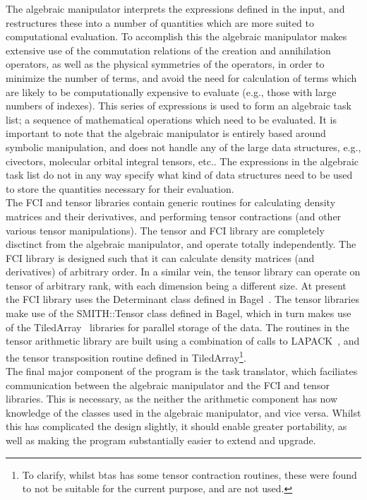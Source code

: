 \noindent The algebraic manipulator interprets the expressions defined
in the input, and restructures these into a number of quantities which are
more suited to computational evaluation. To accomplish this the
algebraic manipulator makes extensive use of the commutation
relations of the creation and annihilation operators, as well as the physical
symmetries of the operators, in order to minimize the number of terms, and
avoid the need for calculation of terms which are likely to be computationally
expensive to evaluate (e.g., those with large numbers of indexes). This series
of expressions is used to form an algebraic task list; a sequence of
mathematical operations which need to be evaluated.  It is important to note
that the algebraic manipulator is entirely based around symbolic manipulation,
and does not handle any of the large data structures, e.g., civectors,
molecular orbital integral tensors, etc.. The expressions in the algebraic
task list do not in any way specify what kind of data structures need to
be used to store the quantities necessary for their evaluation.\\

\noindent The FCI and tensor libraries contain generic routines for
calculating density matrices and their derivatives, and performing tensor
contractions (and other various tensor manipulations). The tensor and FCI
library are completely disctinct from the algebraic manipulator, and operate
totally independently. The FCI library is designed such that it can calculate
density matrices (and derivatives) of arbitrary order. In a similar vein, the
tensor library can operate on tensor of arbitrary rank, with each dimension
being a different size. At present the FCI  library uses the Determinant class
defined in Bagel~\cite{BAGEL}.
The tensor libraries make use of the SMITH::Tensor class defined in Bagel,
which in turn makes use of the TiledArray~\cite{TiledArray} libraries for parallel storage of the data. 
The routines in the tensor arithmetic library are built using 
a combination of calls to LAPACK~\cite{LAPACK}, and the tensor transposition routine defined in
TiledArray\footnote{ To clarify, whilst btas has some tensor contraction routines, 
these were found to not be suitable for the current purpose, and are not used.}.\\

\noindent The final major component of the program is the task translator,
which faciliates communication between the algebraic manipulator and the 
FCI and tensor libraries. This is necessary, as
the neither the arithmetic component has now knowledge of the classes used in
the algebraic manipulator, and vice versa. Whilst this has complicated the
design slightly, it should enable greater portability, as well as making the
program substantially easier to extend and upgrade.\\ 

